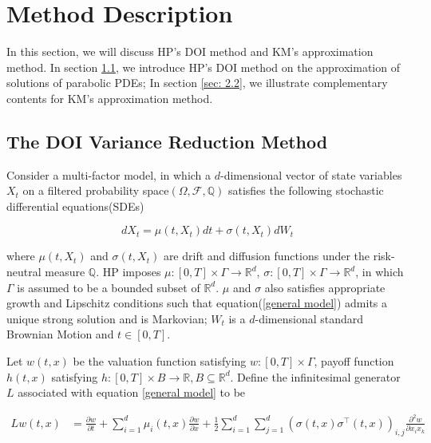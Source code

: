 \chapter{Method Description}\label{ch2}

In this section, we will discuss HP's DOI method and KM's approximation method. In section \ref{sec: 2.1}, we introduce HP's DOI method on the approximation of solutions of parabolic PDEs; In section \ref{sec: 2.2}, we illustrate complementary contents for KM's approximation method.

\section{The DOI Variance Reduction Method}
\label{sec: 2.1}

Consider a multi-factor model, in which a $d$-dimensional vector of state variables $X_t$ on a filtered probability space$(\Omega,\mathcal F, \mathbb Q)$ satisfies the following stochastic differential equations(SDEs)

\begin{equation}\label{general model}
    dX_t= \mu(t, X_t) dt + \sigma(t, X_t) dW_t
\end{equation}

\noindent where $\mu(t,X_t)$ and $\sigma(t, X_t)$ are drift and diffusion functions under the risk-neutral measure $\mathbb Q$. HP imposes $\mu: [0,T] \times \Gamma \rightarrow \mathbb R^d$, $\sigma: [0,T] \times \Gamma \rightarrow \mathbb R^d$, in which $\Gamma$ is assumed to be a bounded subset of $\mathbb R^d$. $\mu$ and $\sigma$ also satisfies appropriate growth and Lipschitz conditions such that equation(\ref{general model}) admits a unique strong solution and is Markovian; $W_t$ is a $d$-dimensional standard Brownian Motion and $t \in [0,T]$.

Let $w(t,x)$ be the valuation function satisfying $w: [0,T] \times \Gamma$, payoff function $h(t,x)$ satisfying $h:[0,T] \times B \rightarrow \mathbb R, B \subseteq \mathbb R^d$. Define the infinitesimal generator $L$ associated with equation \eqref{general model} to be

\begin{equation}\label{general inf gen}
    \begin{aligned}
        L w(t, x)&=\frac{\partial w}{\partial t} + \sum_{i=1}^{d} \mu_i(t, x) \frac{\partial w}{\partial x}+\frac{1}{2} \sum_{i=1}^{d}\sum_{j=1}^{d} (\sigma(t,x) \sigma^{\intercal}(t,x))_{i,j} \frac{\partial^2 w}{\partial x_i x_k}
    \end{aligned}
\end{equation}

